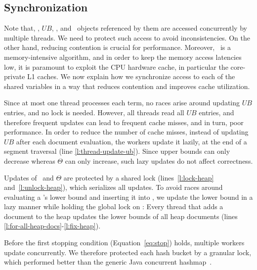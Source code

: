 \subsection{Synchronization} 
\label{sec:synch}

Note that, \DHeap, $UB$, \DMap, and \Docobj\ objects referenced by them are accessed concurrently by multiple threads. We need to protect such access to avoid inconsistencies. On the other hand, reducing contention is crucial for performance. Moreover, 
\alg\ is a memory-intensive algorithm, and 
in order to keep the memory access latencies low, it is paramount to exploit the CPU hardware cache, in particular the core-private L1 caches. 
We now explain how we synchronize access to each of the shared variables
in a way that reduces contention and improves cache utilization. 



Since at most one thread processes each term, no races arise around updating $UB$ entries, and no lock is needed. However, 
all threads read all $UB$ entries, and therefore frequent updates can lead to frequent cache misses, and in turn, poor performance. 
In order to reduce the number of cache misses, instead of updating $UB$ after each document evaluation, the workers update it lazily, at the end of a segment traversal (line \ref{l:thread-update-ub}). Since upper bounds can only decrease whereas $\Theta$ can only increase, such lazy updates do not affect correctness.

Updates of \DHeap\ and $\Theta$ are protected by a shared lock (lines~\ref{l:lock-heap} and~\ref{l:unlock-heap}), which  serializes all updates. 
To avoid races around evaluating a \Docobj's
lower bound and inserting it into \DHeap, we update the lower bound in a lazy manner while holding the global lock on \DHeap: Every thread that adds a document to the heap updates the lower bounds of all heap documents (lines \ref{l:for-all-heap-docs}-\ref{l:fix-heap}).

Before the first stopping condition (Equation~\ref{eq:stop}) holds, multiple workers update \DMap\/ concurrently. 
We therefore protected each hash bucket by a granular lock, which  
performed better than the generic Java concurrent hashmap~\cite{java-hashmap}.


